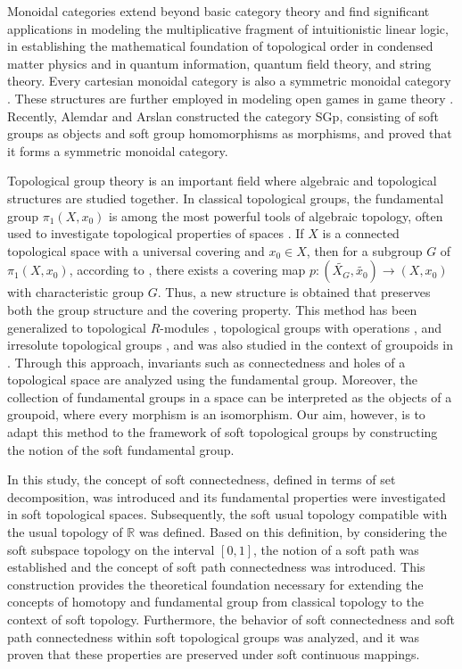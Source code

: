 \documentclass[preprint,12pt]{elsarticle}
\begin{document}
Monoidal categories extend beyond basic category theory and find significant applications in modeling the multiplicative fragment of intuitionistic linear logic, in establishing the mathematical foundation of topological order in condensed matter physics and in quantum information, quantum field theory, and string theory. Every cartesian monoidal category is also a symmetric monoidal category \cite{Baez}. These structures are further employed in modeling open games in game theory \cite{Tripathy}. Recently, Alemdar and Arslan \cite{AlemdarArslan} constructed the category SGp, consisting of soft groups as objects and soft group homomorphisms as morphisms, and proved that it forms a symmetric monoidal category.

Topological group theory is an important field where algebraic and topological structures are studied together. In classical topological groups, the fundamental group $\pi_1(X, x_0)$ is among the most powerful tools of algebraic topology, often used to investigate topological properties of spaces \cite{Rotman}. If $X$ is a connected topological space with a universal covering and $x_0 \in X$, then for a subgroup $G$ of $\pi_1(X, x_0)$, according to \cite[Theorem~10.42]{Rotman}, there exists a covering map $p : (\widetilde{X_G}, \widetilde{x_0}) \to (X, x_0)$ with characteristic group $G$. Thus, a new structure is obtained that preserves both the group structure and the covering property. This method has been generalized to topological $R$-modules \cite{Alemdar2013}, topological groups with operations \cite{MucukandSahan}, and irresolute topological groups \cite{BasarAkiz2025}, and was also studied in the context of groupoids in \cite{Alemdar2012}. Through this approach, invariants such as connectedness and holes of a topological space are analyzed using the fundamental group. Moreover, the collection of fundamental groups in a space can be interpreted as the objects of a groupoid, where every morphism is an isomorphism. Our aim, however, is to adapt this method to the framework of soft topological groups by constructing the notion of the soft fundamental group.

In this study, the concept of soft connectedness, defined in terms of set decomposition, was introduced and its fundamental properties were investigated in soft topological spaces.  Subsequently, the soft usual topology compatible with the usual topology of $\mathbb{R}$ was defined. Based on this definition, by considering the soft subspace topology on the interval $[0,1]$, the notion of a soft path was established and the concept of soft path connectedness was introduced. This construction provides the theoretical foundation necessary for extending the concepts of homotopy and fundamental group from classical topology to the context of soft topology. Furthermore, the behavior of soft connectedness and soft path connectedness within soft topological groups was analyzed, and it was proven that these properties are preserved under soft continuous mappings.
\end{document}

